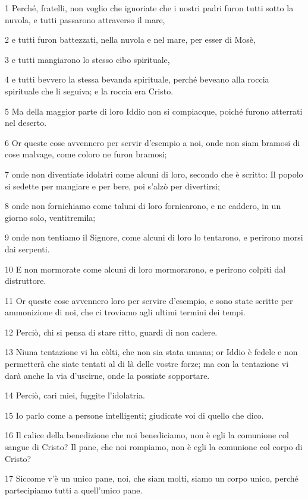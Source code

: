\par 1 Perché, fratelli, non voglio che ignoriate che i nostri padri furon tutti sotto la nuvola, e tutti passarono attraverso il mare,
\par 2 e tutti furon battezzati, nella nuvola e nel mare, per esser di Mosè,
\par 3 e tutti mangiarono lo stesso cibo spirituale,
\par 4 e tutti bevvero la stessa bevanda spirituale, perché beveano alla roccia spirituale che li seguiva; e la roccia era Cristo.
\par 5 Ma della maggior parte di loro Iddio non si compiacque, poiché furono atterrati nel deserto.
\par 6 Or queste cose avvennero per servir d'esempio a noi, onde non siam bramosi di cose malvage, come coloro ne furon bramosi;
\par 7 onde non diventiate idolatri come alcuni di loro, secondo che è scritto: Il popolo si sedette per mangiare e per bere, poi s'alzò per divertirsi;
\par 8 onde non fornichiamo come taluni di loro fornicarono, e ne caddero, in un giorno solo, ventitremila;
\par 9 onde non tentiamo il Signore, come alcuni di loro lo tentarono, e perirono morsi dai serpenti.
\par 10 E non mormorate come alcuni di loro mormorarono, e perirono colpiti dal distruttore.
\par 11 Or queste cose avvennero loro per servire d'esempio, e sono state scritte per ammonizione di noi, che ci troviamo agli ultimi termini dei tempi.
\par 12 Perciò, chi si pensa di stare ritto, guardi di non cadere.
\par 13 Niuna tentazione vi ha còlti, che non sia stata umana; or Iddio è fedele e non permetterà che siate tentati al di là delle vostre forze; ma con la tentazione vi darà anche la via d'uscirne, onde la possiate sopportare.
\par 14 Perciò, cari miei, fuggite l'idolatria.
\par 15 Io parlo come a persone intelligenti; giudicate voi di quello che dico.
\par 16 Il calice della benedizione che noi benediciamo, non è egli la comunione col sangue di Cristo? Il pane, che noi rompiamo, non è egli la comunione col corpo di Cristo?
\par 17 Siccome v'è un unico pane, noi, che siam molti, siamo un corpo unico, perché partecipiamo tutti a quell'unico pane.
